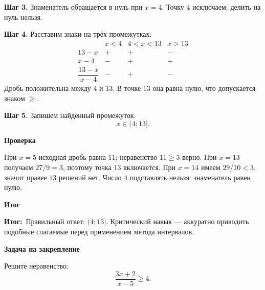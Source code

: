 \documentclass[a4paper,12pt]{article}
\newcommand{\smalllabel}[1]{\par\smallskip\textbf{#1}\par\nobreak}
\newcommand{\finalmsg}{\textcolor{accent}{\textbf{Итог:}}}
\begin{document}
\textbf{Шаг 3.} Знаменатель обращается в нуль при $x=4$.
Точку $4$ исключаем: делить на нуль нельзя.

\textbf{Шаг 4.} Расставим знаки на трёх промежутках:
\[
\renewcommand{\arraystretch}{1.35}
\begin{array}{c|ccc}
 & x<4 & 4<x<13 & x>13\\ \hline
 13-x & + & + & -\\
 x-4  & - & + & +\\ \hline
 \dfrac{13-x}{x-4} & - & + & -
\end{array}
\]
Дробь положительна между $4$ и $13$. В точке $13$ она
равна нулю, что допускается знаком $\ge$.

\textbf{Шаг 5.} Запишем найденный промежуток:
\[
\boxed{x\in(4;13]}.
\]
\smalllabel{Проверка}
При $x=5$ исходная дробь равна $11$; неравенство $11\ge3$ верно.
При $x=13$ получаем $27/9=3$, поэтому точка $13$ включается.
При $x=14$ имеем $29/10<3$, значит правее $13$ решений нет.
Число $4$ подставлять нельзя: знаменатель равен нулю.

\smalllabel{Итог}
\finalmsg\ Правильный ответ: $\boxed{(4;13]}$.
Критический навык --- аккуратно приводить подобные слагаемые
перед применением метода интервалов.

\smalllabel{Задача на закрепление}
Решите неравенство:
\[
\frac{3x+2}{x-5}\ge4.
\]
\end{document}
